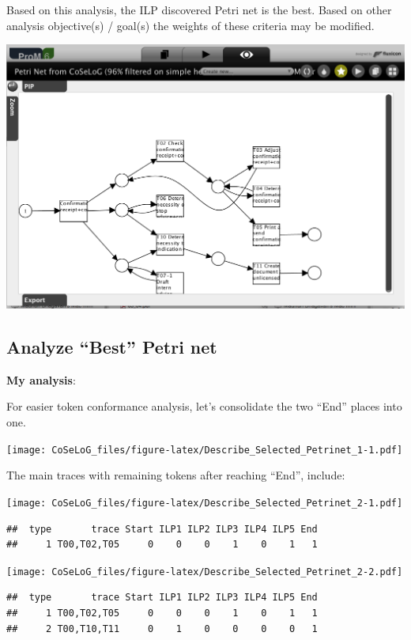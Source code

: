 \documentclass[]{article}
\begin{document}
Based on this analysis, the ILP discovered Petri net is the best. Based
on other analysis objective(s) / goal(s) the weights of these criteria
may be modified.

\includegraphics{CoSeLoG_Step_05_Filter96_PetriNet_ILP.png}

\subsection{Analyze ``Best'' Petri net}\label{analyze-best-petri-net}

\textbf{My analysis}:

For easier token conformance analysis, let's consolidate the two ``End''
places into one.

\texttt{[image: CoSeLoG\_files/figure-latex/Describe\_Selected\_Petrinet\_1-1.pdf]}

The main traces with remaining tokens after reaching ``End'', include:

\texttt{[image: CoSeLoG\_files/figure-latex/Describe\_Selected\_Petrinet\_2-1.pdf]}

\begin{verbatim}
##  type       trace Start ILP1 ILP2 ILP3 ILP4 ILP5 End
##     1 T00,T02,T05     0    0    0    1    0    1   1
\end{verbatim}

\texttt{[image: CoSeLoG\_files/figure-latex/Describe\_Selected\_Petrinet\_2-2.pdf]}

\begin{verbatim}
##  type       trace Start ILP1 ILP2 ILP3 ILP4 ILP5 End
##     1 T00,T02,T05     0    0    0    1    0    1   1
##     2 T00,T10,T11     0    1    0    0    0    0   1
\end{verbatim}
\end{document}
